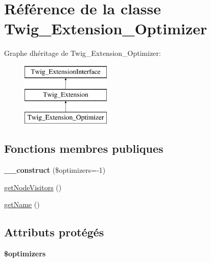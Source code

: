 \hypertarget{class_twig___extension___optimizer}{}\section{Référence de la classe Twig\+\_\+\+Extension\+\_\+\+Optimizer}
\label{class_twig___extension___optimizer}
Graphe d\textquotesingle{}héritage de Twig\+\_\+\+Extension\+\_\+\+Optimizer\+:\begin{figure}[H]
\begin{center}
\leavevmode
\includegraphics[height=3.000000cm]{class_twig___extension___optimizer}
\end{center}
\end{figure}
\subsection*{Fonctions membres publiques}
\begin{DoxyCompactItemize}
\item 
{\bfseries \+\_\+\+\_\+construct} (\$optimizers=-\/1)\hypertarget{class_twig___extension___optimizer_a39e1de056975cf1aea3660cbd2c0ebc9}{}\label{class_twig___extension___optimizer_a39e1de056975cf1aea3660cbd2c0ebc9}

\item 
\hyperlink{class_twig___extension___optimizer_aec02093179d390d22ae4083f23a1d74a}{get\+Node\+Visitors} ()
\item 
\hyperlink{class_twig___extension___optimizer_a3d0963e68bb313b163a73f2803c64600}{get\+Name} ()
\end{DoxyCompactItemize}
\subsection*{Attributs protégés}
\begin{DoxyCompactItemize}
\item 
{\bfseries \$optimizers}\hypertarget{class_twig___extension___optimizer_ac72228b8f9868fc4880a13d6d823d754}{}\label{class_twig___extension___optimizer_ac72228b8f9868fc4880a13d6d823d754}

\end{DoxyCompactItemize}


